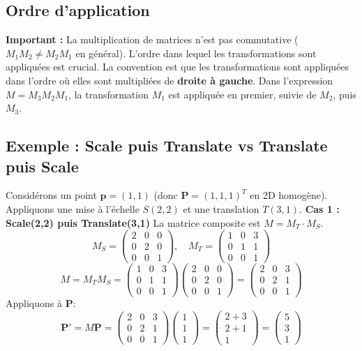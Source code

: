 \subsection{Ordre d'application}
\textbf{Important :} La multiplication de matrices n'est pas commutative (\( M_1 M_2 \neq M_2 M_1 \) en général). L'ordre dans lequel les transformations sont appliquées est crucial.
La convention est que les transformations sont appliquées dans l'ordre où elles sont multipliées de \textbf{droite à gauche}. Dans l'expression \( M = M_3 M_2 M_1 \), la transformation \( M_1 \) est appliquée en premier, suivie de \( M_2 \), puis \( M_3 \).
\subsection{Exemple : Scale puis Translate vs Translate puis Scale}
Considérons un point \( \mathbf{p} = (1, 1) \) (donc \( \mathbf{P}=(1, 1, 1)^T \) en 2D homogène).
Appliquons une mise à l'échelle \( S(2, 2) \) et une translation \( T(3, 1) \).
\textbf{Cas 1 : Scale(2,2) puis Translate(3,1)}
La matrice composite est \( M = M_T \cdot M_S \).
\[ M_S = \begin{pmatrix} 2 & 0 & 0 \\ 0 & 2 & 0 \\ 0 & 0 & 1 \end{pmatrix}, \quad M_T = \begin{pmatrix} 1 & 0 & 3 \\ 0 & 1 & 1 \\ 0 & 0 & 1 \end{pmatrix} \]
\[ M = M_T M_S = \begin{pmatrix} 1 & 0 & 3 \\ 0 & 1 & 1 \\ 0 & 0 & 1 \end{pmatrix} \begin{pmatrix} 2 & 0 & 0 \\ 0 & 2 & 0 \\ 0 & 0 & 1 \end{pmatrix} = \begin{pmatrix} 2 & 0 & 3 \\ 0 & 2 & 1 \\ 0 & 0 & 1 \end{pmatrix} \]
Appliquons à \( \mathbf{P} \):
\[ \mathbf{P'} = M \mathbf{P} = \begin{pmatrix} 2 & 0 & 3 \\ 0 & 2 & 1 \\ 0 & 0 & 1 \end{pmatrix} \begin{pmatrix} 1 \\ 1 \\ 1 \end{pmatrix} = \begin{pmatrix} 2+3 \\ 2+1 \\ 1 \end{pmatrix} = \begin{pmatrix} 5 \\ 3 \\ 1 \end{pmatrix} \]

